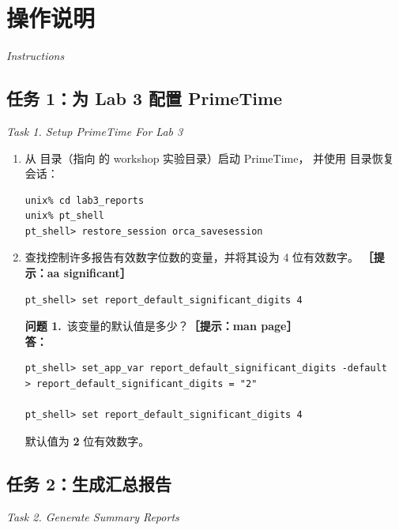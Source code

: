 \section{操作说明}
\label{lab3:instructions}

\noindent\textit{Instructions}

\subsection{任务 1：为 Lab 3 配置 PrimeTime}
\label{lab3:task1}

\noindent\textit{Task 1. Setup PrimeTime For Lab 3}

\begin{enumerate}
  \item 从  目录（指向  的 workshop 实验目录）启动 PrimeTime，
        并使用  目录恢复会话：
\begin{lstlisting}
unix% cd lab3_reports
unix% pt_shell
pt_shell> restore_session orca_savesession
\end{lstlisting}

  \item 查找控制许多报告有效数字位数的变量，并将其设为 4 位有效数字。
        \textbf{［提示：aa significant］}
\begin{lstlisting}
pt_shell> set report_default_significant_digits 4
\end{lstlisting}

\begin{questionBox}
\textbf{问题 1.}\ 该变量的默认值是多少？\textbf{［提示：man page］}\\[0.35em]
\textbf{答：}\\
\begin{lstlisting}
pt_shell> set_app_var report_default_significant_digits -default
> report_default_significant_digits = "2"

pt_shell> set report_default_significant_digits 4
\end{lstlisting}
默认值为 \textbf{2} 位有效数字。
\end{questionBox}
\end{enumerate}

\subsection{任务 2：生成汇总报告}
\label{lab3:task2}

\noindent\textit{Task 2. Generate Summary Reports}

